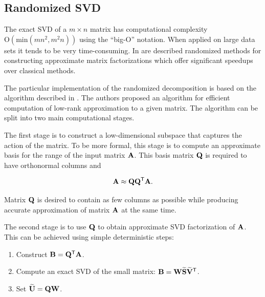 
\subsection{Randomized SVD}

The exact SVD of a $m \times n$ matrix has computational complexity \newline $\mathrm{O}(\mathrm{min}(mn^2, m^2n))$ using the ``big-O'' notation. When applied on large data sets it tends to be very time-consuming. In \cite{Candes2011, Woolfe2008, Martinsson2011, Szlam2014} are described randomized methods for constructing approximate matrix factorizations which offer significant speedups over classical methods.

The particular implementation of the randomized decomposition is based on the algorithm described in \cite{Halko2011}. The authors proposed an algorithm for efficient computation of low-rank approximation to a given matrix. The algorithm can be split into two main computational stages.

The first stage is to construct a low-dimensional subspace that captures the action of the matrix. To be more formal, this stage is to compute an approximate basis for the range of the input matrix $\mathbf{A}$. This basis matrix $\mathbf{Q}$ is required to have orthonormal columns and

\begin{equation}
\mathbf{A} \approx \mathbf{Q} \mathbf{Q}^{\mathsf{T}} \mathbf{A}.
\end{equation}

\noindent
Matrix $\mathbf{Q}$ is desired to contain as few columns as possible while producing accurate approximation of matrix $\mathbf{A}$ at the same time.

The second stage is to use $\mathbf{Q}$ to obtain approximate SVD factorization of $\mathbf{A}$. This can be achieved using simple deterministic steps:

\begin{enumerate}
\item Construct $\mathbf{B} = \mathbf{Q}^{\mathsf{T}} \mathbf{A}$.
\item Compute an exact SVD of the small matrix: $\mathbf{B}=\mathbf{W}\mathbf{\widetilde{S}}\mathbf{\widetilde{V}}^{\mathsf{T}}$.
\item Set $\mathbf{\widetilde{U}}=\mathbf{Q}\mathbf{W}$.
\end{enumerate}

